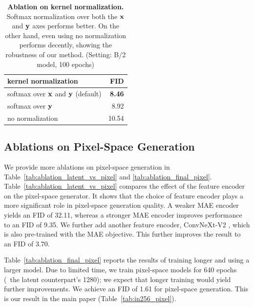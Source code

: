 \renewcommand{\topfraction}{0.95}
\renewcommand{\bottomfraction}{0.95}
\renewcommand{\textfraction}{0.05}
\renewcommand{\floatpagefraction}{0.9}

\begin{table}[t]
    \centering
    \caption{\textbf{Ablation on kernel normalization.}
    Softmax normalization over both the $\mathbf{x}$ and $\mathbf{y}$ axes performs better. On the other hand, even using no normalization performs decently, showing the robustness of our method.
    (Setting: B/2 model, 100 epochs)
    }
    \label{tab:kernel_normalization}
    \tablefontsize
    \begin{tabular}{l r}
    \toprule
    kernel normalization & FID \\
    \midrule
    softmax over $\mathbf{x}$ and $\mathbf{y}$ (default) & \textbf{8.46} \\
    softmax over $\mathbf{y}$ & 8.92 \\
    no normalization & 10.54 \\
    \bottomrule
    \end{tabular}
    \vspace{-.5em}
\end{table}

\subsection{Ablations on Pixel-Space Generation}
\label{section:exp_pixel_space}

We provide more ablations on pixel-space generation in Table~\ref{tab:ablation_latent_vs_pixel} and \ref{tab:ablation_final_pixel}.
Table~\ref{tab:ablation_latent_vs_pixel} compares the effect of the feature encoder on the pixel-space generator. 
It shows that the choice of feature encoder plays a more significant role in pixel-space generation quality.
A weaker MAE encoder yields an FID of 32.11, whereas a stronger MAE encoder improves performance to an FID of 9.35.
We further add another feature encoder, ConvNeXt-V2 \cite{woo2023convnext}, which is also pre-trained with the MAE objective. This further improves the result to an FID of 3.70.

Table~\ref{tab:ablation_final_pixel} reports the results of training longer and using a larger model. Due to limited time, we train pixel-space models for 640 epochs (\vs~the latent counterpart's 1280); we expect that longer training would yield further improvements.
We achieve an FID of 1.61 for pixel-space generation. This is our result in the main paper (Table~\ref{tab:in256_pixel}).

